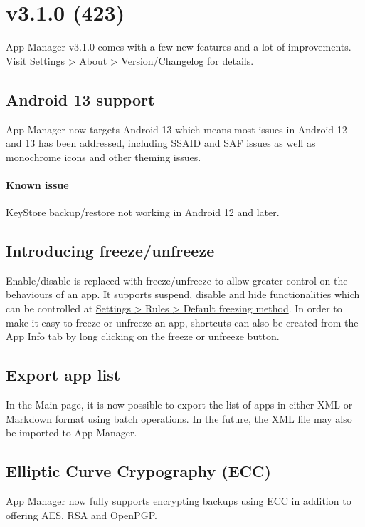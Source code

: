 \section{v3.1.0 (423)}\label{sec:v3.1.0-(423)}

App Manager v3.1.0 comes with a few new features and a lot of improvements.
Visit \href{app-manager://settings/about/version}{Settings > About > Version/Changelog} for details.

\subsection{Android 13 support}
App Manager now targets Android 13 which means most issues in Android 12 and 13 has been addressed, including SSAID and SAF issues as well as monochrome icons and other theming issues.

\paragraph{Known issue} KeyStore backup/restore not working in Android 12 and later.

\subsection{Introducing freeze/unfreeze}
Enable/disable is replaced with freeze/unfreeze to allow greater control on the behaviours of an app.
It supports suspend, disable and hide functionalities which can be controlled at
\href{app-manager://settings/rules_prefs/freeze_type}{Settings > Rules > Default freezing method}.
In order to make it easy to freeze or unfreeze an app, shortcuts can also be created from the App Info tab by long clicking on the freeze or unfreeze button.

\subsection{Export app list}
In the Main page, it is now possible to export the list of apps in either XML or Markdown format using batch operations.
In the future, the XML file may also be imported to App Manager.

\subsection{Elliptic Curve Crypography (ECC)}
App Manager now fully supports encrypting backups using ECC in addition to offering AES, RSA and OpenPGP\@.

